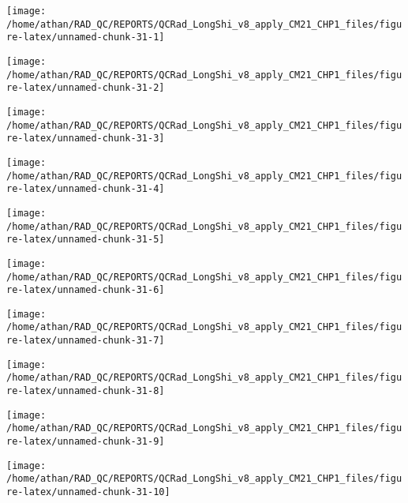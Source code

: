 \documentclass[
  10pt,
  a4paper,oneside]{article}
\begin{document}
\begin{center}\texttt{[image: /home/athan/RAD\_QC/REPORTS/QCRad\_LongShi\_v8\_apply\_CM21\_CHP1\_files/figure-latex/unnamed-chunk-31-1]} \end{center}

\begin{center}\texttt{[image: /home/athan/RAD\_QC/REPORTS/QCRad\_LongShi\_v8\_apply\_CM21\_CHP1\_files/figure-latex/unnamed-chunk-31-2]} \end{center}

\begin{center}\texttt{[image: /home/athan/RAD\_QC/REPORTS/QCRad\_LongShi\_v8\_apply\_CM21\_CHP1\_files/figure-latex/unnamed-chunk-31-3]} \end{center}

\begin{center}\texttt{[image: /home/athan/RAD\_QC/REPORTS/QCRad\_LongShi\_v8\_apply\_CM21\_CHP1\_files/figure-latex/unnamed-chunk-31-4]} \end{center}

\begin{center}\texttt{[image: /home/athan/RAD\_QC/REPORTS/QCRad\_LongShi\_v8\_apply\_CM21\_CHP1\_files/figure-latex/unnamed-chunk-31-5]} \end{center}

\begin{center}\texttt{[image: /home/athan/RAD\_QC/REPORTS/QCRad\_LongShi\_v8\_apply\_CM21\_CHP1\_files/figure-latex/unnamed-chunk-31-6]} \end{center}

\begin{center}\texttt{[image: /home/athan/RAD\_QC/REPORTS/QCRad\_LongShi\_v8\_apply\_CM21\_CHP1\_files/figure-latex/unnamed-chunk-31-7]} \end{center}

\begin{center}\texttt{[image: /home/athan/RAD\_QC/REPORTS/QCRad\_LongShi\_v8\_apply\_CM21\_CHP1\_files/figure-latex/unnamed-chunk-31-8]} \end{center}

\begin{center}\texttt{[image: /home/athan/RAD\_QC/REPORTS/QCRad\_LongShi\_v8\_apply\_CM21\_CHP1\_files/figure-latex/unnamed-chunk-31-9]} \end{center}

\begin{center}\texttt{[image: /home/athan/RAD\_QC/REPORTS/QCRad\_LongShi\_v8\_apply\_CM21\_CHP1\_files/figure-latex/unnamed-chunk-31-10]} \end{center}
\end{document}

